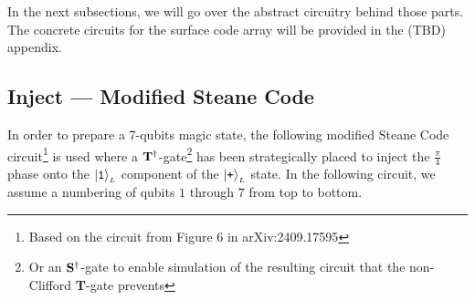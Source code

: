 \documentclass{article}
\newcommand{\Op}[1]{{\bf #1}}
\newcommand{\kett}[1]{\ket{\mbox{\tt #1}}}
\begin{document}

	In the next subsections, we will go over the abstract circuitry behind those parts. The concrete circuits for the surface code array will be provided in the (TBD) appendix.

	\newpage

	\subsection{\mbox{\sc Inject} --- Modified Steane Code}

	In order to prepare a 7-qubits magic state, the following modified Steane Code circuit\footnote{Based on the circuit from Figure 6 in arXiv:2409.17595} is used where a $\Op{T}^\dagger$-gate\footnote{Or an $\Op{S}^\dagger$-gate to enable simulation of the resulting circuit that the non-Clifford \Op{T}-gate prevents} has been strategically placed to inject the $\frac{\pi}{4}$ phase onto the $\kett{1}_{\scriptscriptstyle L}$ component of the $\kett{+}_{\scriptscriptstyle L}$ state. In the following circuit, we assume a numbering of qubits $1$ through $7$ from top to bottom. 
\end{document}
